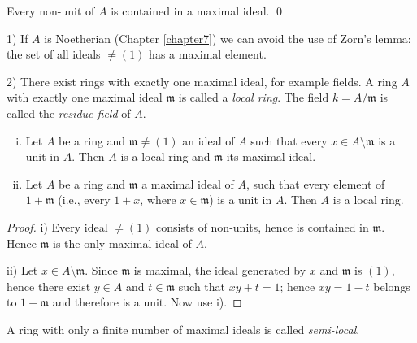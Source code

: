 \begin{corollary}\label{cor:nonunit-in-maximal}
Every non-unit of $A$ is contained in a maximal ideal. \qed
\end{corollary}

\begin{remark}
1) If $A$ is Noetherian (Chapter \ref{chapter7}) we can avoid the use of Zorn's lemma: the set of all ideals $\neq (1)$ has a maximal element.

2) There exist rings with exactly one maximal ideal, for example fields. A ring $A$ with exactly one maximal ideal $\mathfrak{m}$ is called a \emph{local ring}. The field $k = A/\mathfrak{m}$ is called the \emph{residue field} of $A$.
\end{remark}

\begin{proposition}\label{prop:local-ring-characterization}
\begin{enumerate}[i)]
    \item Let $A$ be a ring and $\mathfrak{m} \neq (1)$ an ideal of $A$ such that every $x \in A \setminus \mathfrak{m}$ is a unit in $A$. Then $A$ is a local ring and $\mathfrak{m}$ its maximal ideal.
    \item Let $A$ be a ring and $\mathfrak{m}$ a maximal ideal of $A$, such that every element of $1 + \mathfrak{m}$ (i.e., every $1 + x$, where $x \in \mathfrak{m}$) is a unit in $A$. Then $A$ is a local ring.
\end{enumerate}
\end{proposition}

\begin{proof}
\noindent i) Every ideal $\neq (1)$ consists of non-units, hence is contained in $\mathfrak{m}$. Hence $\mathfrak{m}$ is the only maximal ideal of $A$.

ii) Let $x \in A \setminus \mathfrak{m}$. Since $\mathfrak{m}$ is maximal, the ideal generated by $x$ and $\mathfrak{m}$ is $(1)$, hence there exist $y \in A$ and $t \in \mathfrak{m}$ such that $xy + t = 1$; hence $xy = 1 - t$ belongs to $1 + \mathfrak{m}$ and therefore is a unit. Now use i).
\end{proof}

A ring with only a finite number of maximal ideals is called \emph{semi-local}.

